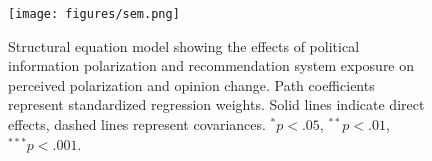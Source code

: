 \begin{figure}[htbp]
    \centering
    \texttt{[image: figures/sem.png]}
    \caption{Structural equation model showing the effects of political information polarization and recommendation system exposure on perceived polarization and opinion change. Path coefficients represent standardized regression weights. Solid lines indicate direct effects, dashed lines represent covariances. $^*p < .05$, $^{**}p < .01$, $^{***}p < .001$.}
    \label{fig:path-model}
\end{figure}
